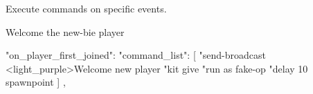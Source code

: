 
Execute commands on specific events.


\begin{example}{Welcome the new-bie player}
    \begin{json}
        "on_player_first_joined": {
            "command_list": [
            "send-broadcast <light_purple>Welcome new player %
            "kit give %
            "run as fake-op %
            "delay 10 spawnpoint %
            ]
        },
    \end{json}
\end{example}